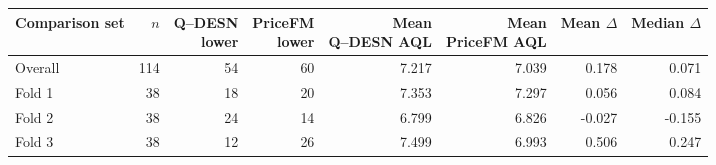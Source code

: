 \begingroup
\TableStyle
\scriptsize
\setlength{\tabcolsep}{3pt}
\begin{tabular}{@{}lrrrrrrr@{}}
\toprule
Comparison set & $n$ & \shortstack{Q--DESN\\lower} & \shortstack{PriceFM\\lower} & \shortstack{Mean\\Q--DESN AQL} & \shortstack{Mean\\PriceFM AQL} & \shortstack{Mean\\$\Delta$} & \shortstack{Median\\$\Delta$} \\
\midrule
Overall & 114 & 54 & 60 & 7.217 & 7.039 & 0.178 & 0.071 \\
Fold 1 & 38 & 18 & 20 & 7.353 & 7.297 & 0.056 & 0.084 \\
Fold 2 & 38 & 24 & 14 & 6.799 & 6.826 & -0.027 & -0.155 \\
Fold 3 & 38 & 12 & 26 & 7.499 & 6.993 & 0.506 & 0.247 \\
\bottomrule
\end{tabular}
\endgroup
